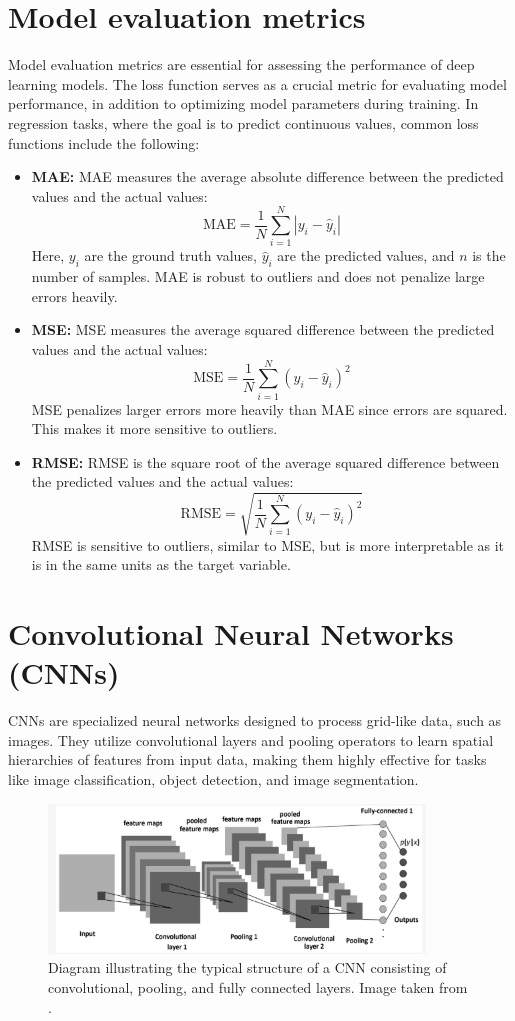 \section{Model evaluation metrics}
Model evaluation metrics are essential for assessing the performance of deep learning models. The loss function serves as a crucial metric for evaluating model performance, in addition to optimizing model parameters during training. In regression tasks, where the goal is to predict continuous values, common loss functions include the following:
\begin{itemize}
\item \textbf{\gls{MAE}:} MAE measures the average absolute difference between the predicted values and the actual values:\[ \text{MAE} = \frac{1}{N} \sum_{i=1}^{N} |y_i - \hat{y}_i| \] Here, $y_i$ are the ground truth values, $\hat{y}_i$ are the predicted values, and $n$ is the number of samples. MAE is robust to outliers and does not penalize large errors heavily.
\item \textbf{\gls{MSE}:} MSE measures the average squared difference between the predicted values and the actual values:\[ \text{MSE} = \frac{1}{N} \sum_{i=1}^{N} (y_i - \hat{y}_i)^2 \] MSE penalizes larger errors more heavily than MAE since errors are squared. This makes it more sensitive to outliers. 
\item \textbf{\gls{RMSE}:} RMSE is the square root of the average squared difference between the predicted values and the actual values: \[ \text{RMSE} = \sqrt{\frac{1}{N} \sum_{i=1}^{N} (y_i - \hat{y}_i)^2} \]RMSE is sensitive to outliers, similar to MSE, but is more interpretable as it is in the same units as the target variable.
\end{itemize}
\section{Convolutional Neural Networks (CNNs)} \label{cnnse}
\gls{CNN}s \cite{lecun1998} are specialized neural networks designed to process grid-like data, such as images. They utilize convolutional layers and pooling operators to learn spatial hierarchies of features from input data, making them highly effective for tasks like image classification, object detection, and image segmentation.
\begin{figure}[ht]
    \centering
    \includegraphics[width=10cm]{images/Theory-DL/CNN.png}
    \caption{Diagram illustrating the typical structure of a CNN consisting of convolutional, pooling, and fully connected layers. Image taken from \cite{cnnimage}.}
    \label{fig:CNN}
  \end{figure}
